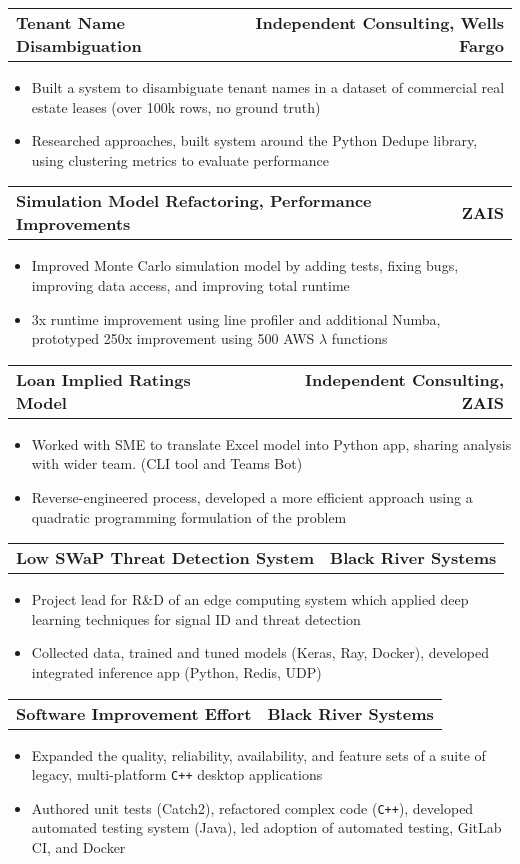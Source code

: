 \documentclass[letterpaper,10pt]{article}
\newcommand{\myitem}{\item[$\triangleright$]}
\newcommand{\twoColSubHeading}[2]{
		\begin{tabularx}{\columnwidth}{Xr}
				\textbf{#1} & \textbf{#2}
		\end{tabularx}
	}
\begin{document}
		\twoColSubHeading{Tenant Name Disambiguation}{Independent Consulting, Wells Fargo}
		\begin{itemize}
			\myitem Built a system to disambiguate tenant names in a dataset of commercial real estate leases (over 100k rows, no ground truth)
			\myitem Researched approaches, built system around the Python Dedupe library, using clustering metrics to evaluate performance
		\end{itemize}
		\twoColSubHeading{Simulation Model Refactoring, Performance Improvements}{ZAIS}
		\begin{itemize}
			\myitem Improved Monte Carlo simulation model by adding tests, fixing bugs, improving data access, and improving total runtime
			\myitem 3x runtime improvement using line profiler and additional Numba, prototyped 250x improvement using 500 AWS $\lambda$ functions
		\end{itemize}
		\twoColSubHeading{Loan Implied Ratings Model}{Independent Consulting, ZAIS}
		\begin{itemize}
			\myitem Worked with SME to translate Excel model into Python app, sharing analysis with wider team. (CLI tool and Teams Bot)
			\myitem Reverse-engineered process, developed a more efficient approach using a quadratic programming formulation of the problem
		\end{itemize}
		\twoColSubHeading{Low SWaP Threat Detection System}{Black River Systems}
			\begin{itemize}
				\myitem Project lead for R\&D of an edge computing system which applied deep learning techniques for signal ID and threat detection
				\myitem Collected data, trained and tuned models (Keras, Ray, Docker), developed integrated inference app (Python, Redis, UDP)
			\end{itemize}
		\twoColSubHeading{Software Improvement Effort}{Black River Systems}
			\begin{itemize}
				\myitem Expanded the quality, reliability, availability, and feature sets of a suite of legacy, multi-platform \verb!C++! desktop applications
				\myitem Authored unit tests (Catch2), refactored complex code (\verb!C++!), developed automated testing system (Java), led adoption of automated testing, GitLab CI, and Docker
			\end{itemize}
\end{document}
